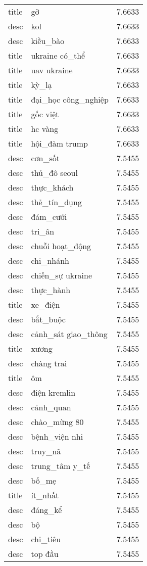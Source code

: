 \documentclass{article}
\begin{document}
\begin{tabular}{lll}
title & gỡ & 7.6633\\
desc & kol & 7.6633\\
desc & kiều\_bào & 7.6633\\
title & ukraine có\_thể & 7.6633\\
title & uav ukraine & 7.6633\\
title & kỳ\_lạ & 7.6633\\
title & đại\_học công\_nghiệp & 7.6633\\
title & gốc việt & 7.6633\\
title & hc vàng & 7.6633\\
title & hội\_đàm trump & 7.6633\\
desc & cơn\_sốt & 7.5455\\
desc & thủ\_đô seoul & 7.5455\\
desc & thực\_khách & 7.5455\\
desc & thẻ\_tín\_dụng & 7.5455\\
desc & đám\_cưới & 7.5455\\
desc & tri\_ân & 7.5455\\
desc & chuỗi hoạt\_động & 7.5455\\
desc & chi\_nhánh & 7.5455\\
desc & chiến\_sự ukraine & 7.5455\\
desc & thực\_hành & 7.5455\\
title & xe\_điện & 7.5455\\
desc & bắt\_buộc & 7.5455\\
desc & cảnh\_sát giao\_thông & 7.5455\\
title & xương & 7.5455\\
desc & chàng trai & 7.5455\\
title & ôm & 7.5455\\
desc & điện kremlin & 7.5455\\
desc & cảnh\_quan & 7.5455\\
desc & chào\_mừng 80 & 7.5455\\
desc & bệnh\_viện nhi & 7.5455\\
desc & truy\_nã & 7.5455\\
desc & trung\_tâm y\_tế & 7.5455\\
desc & bố\_mẹ & 7.5455\\
title & ít\_nhất & 7.5455\\
desc & đáng\_kể & 7.5455\\
desc & bộ & 7.5455\\
desc & chi\_tiêu & 7.5455\\
desc & top đầu & 7.5455\\

\end{tabular}
\end{document}
